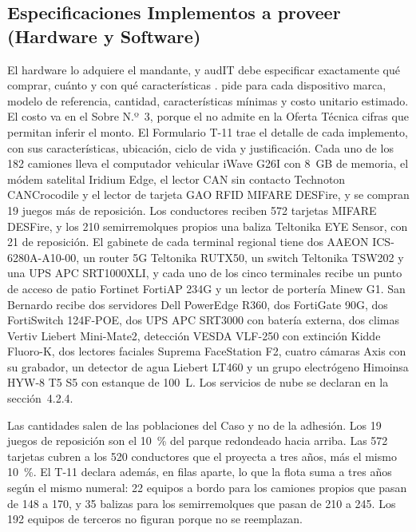 \subsection{Especificaciones Implementos a proveer (Hardware y Software)}\label{sec:4-implementos}

El hardware lo adquiere el mandante, y audIT debe especificar exactamente qué comprar, cuánto y con
qué características .  pide para cada dispositivo marca,
modelo de referencia, cantidad, características mínimas y costo unitario estimado. El costo va en el
Sobre N.º~3, porque el  no admite en la Oferta Técnica cifras que permitan inferir el
monto. El Formulario T-11 trae el detalle de cada
implemento, con sus características, ubicación, ciclo de vida y justificación. Cada uno de los 182 camiones lleva el computador vehicular iWave G26I con 8~GB de memoria, el
módem satelital Iridium Edge, el lector CAN sin contacto Technoton CANCrocodile y el lector de tarjeta
GAO RFID MIFARE DESFire, y se compran 19 juegos más de reposición. Los conductores reciben 572 tarjetas
MIFARE DESFire, y los 210 semirremolques propios una baliza Teltonika EYE Sensor, con 21 de reposición.
El gabinete de cada terminal regional tiene dos AAEON ICS-6280A-A10-00, un router 5G Teltonika RUTX50, un
switch Teltonika TSW202 y una UPS APC SRT1000XLI, y cada uno de los cinco terminales recibe un punto de
acceso de patio Fortinet FortiAP 234G y un lector de portería Minew G1. San Bernardo recibe dos
servidores Dell PowerEdge R360, dos FortiGate 90G, dos FortiSwitch 124F-POE, dos UPS APC SRT3000 con
batería externa, dos climas Vertiv Liebert Mini-Mate2, detección VESDA VLF-250 con extinción Kidde
Fluoro-K, dos lectores faciales Suprema FaceStation F2, cuatro cámaras Axis con su grabador, un detector
de agua Liebert LT460 y un grupo electrógeno Himoinsa HYW-8 T5 S5 con estanque de 100~L. Los servicios
de nube se declaran en la sección~4.2.4.

Las cantidades salen de las poblaciones del Caso y no de la adhesión. Los 19 juegos de reposición son el
10~\% del parque redondeado hacia arriba. Las 572 tarjetas cubren a los 520 conductores que el
 proyecta a tres años, más el mismo 10~\%. El T-11 declara además, en filas
aparte, lo que la flota suma a tres años según el mismo numeral: 22 equipos a bordo para los camiones
propios que pasan de 148 a 170, y 35 balizas para los semirremolques que pasan de 210 a 245. Los 192
equipos de terceros no figuran porque no se reemplazan.


